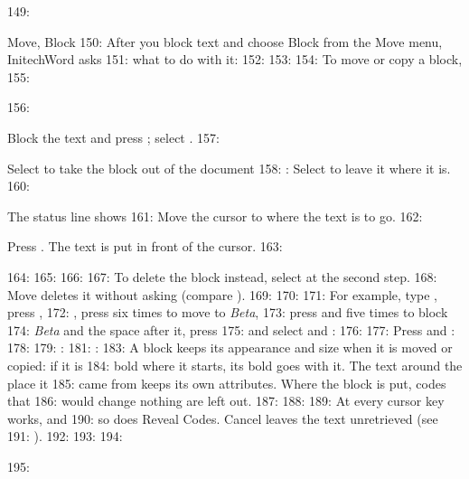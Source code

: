 149: \begin{Feature}{Move, Block}
150: After you block text and choose Block from the Move menu, InitechWord asks
151: what to do with it:
152: 
153: 
154: To move or copy a block,
155: \begin{WPSteps}
156: \item Block the text and press ; select .
157: \item Select  to take the block out of the document
158: : Select  to leave it where it is.
160: \item The status line shows 
161: Move the cursor to where the text is to go.
162: \item Press .  The text is put in front of the cursor.
163: \end{WPSteps}
164: 
165: 
166: 
167: To delete the block instead, select  at the second step.
168: Move deletes it without asking (compare ).
169: 
170: 
171: For example, type , press ,
172: , press  six times to move to \textit{Beta},
173: press  and  five times to block
174: \textit{Beta} and the space after it, press
175:  and select  and :
176: 
177: Press  and :
178: 
179: : 
181: : 
183: A block keeps its appearance and size when it is moved or copied: if it is
184: bold where it starts, its bold goes with it.  The text around the place it
185: came from keeps its own attributes.  Where the block is put, codes that
186: would change nothing are left out.
187: 
188: 
189: At  every cursor key works, and
190: so does Reveal Codes.  Cancel leaves the text unretrieved (see
191: ).
192: 
193: 
194: \end{Feature}
195: 
